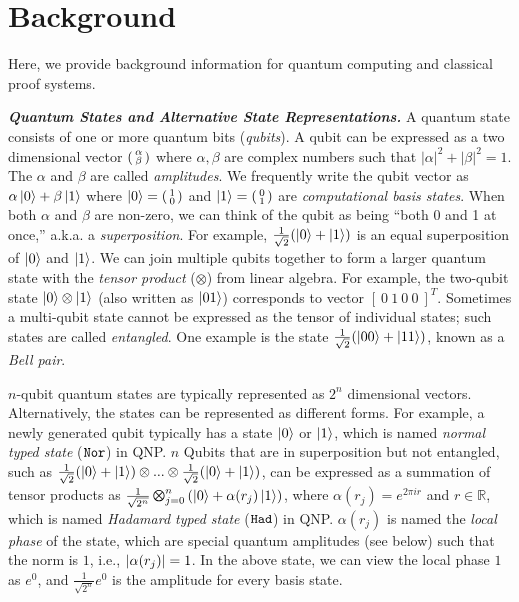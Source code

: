 \section{Background}
\label{sec:background}

Here, we provide background information for quantum computing and classical proof systems.

\noindent\textbf{\textit{Quantum States and Alternative State Representations.}} A quantum state consists of one or more quantum bits (\emph{qubits}). A qubit can be expressed as a two dimensional vector $\begin{psmallmatrix} \alpha \\ \beta \end{psmallmatrix}$ where $\alpha,\beta$ are complex numbers such that $|\alpha|^2 + |\beta|^2 = 1$.  The $\alpha$ and $\beta$ are called \emph{amplitudes}. 
%
We frequently write the qubit vector as $\alpha\left\vert{0}\right\rangle + \beta\left\vert{1}\right\rangle$ where $\left\vert{0}\right\rangle = \begin{psmallmatrix} 1 \\ 0 \end{psmallmatrix}$ and $\left\vert{1}\right\rangle = \begin{psmallmatrix} 0 \\ 1 \end{psmallmatrix}$ are \emph{computational basis states}. When both $\alpha$ and $\beta$ are non-zero, we can think of the qubit as being ``both 0 and 1 at once,'' a.k.a. a \emph{superposition}. For example, $\frac{1}{\sqrt{2}}(\left\vert{0}\right\rangle + \left\vert{1}\right\rangle)$ is an equal superposition of $\left\vert{0}\right\rangle$ and $\left\vert{1}\right\rangle$. 
We can join multiple qubits together to form a larger quantum state with the \emph{tensor product} ($\otimes$) from linear algebra. For example, the two-qubit state $\left\vert{0}\right\rangle \otimes \left\vert{1}\right\rangle$ (also written as $\left\vert{01}\right\rangle$) corresponds to vector $[~0~1~0~0~]^T$. 
Sometimes a multi-qubit state cannot be expressed as the tensor of individual states; such states are called \emph{entangled}. One example is the state $\frac{1}{\sqrt{2}}(\left\vert{00}\right\rangle + \left\vert{11}\right\rangle)$, known as a \emph{Bell pair}.

$n$-qubit quantum states are typically represented as $2^n$ dimensional vectors. Alternatively, the states can be represented as different forms. For example, a newly generated qubit typically has a state $\left\vert{0}\right\rangle$ or $\left\vert{1}\right\rangle$, which is named \textit{normal typed state} ($\texttt{Nor}$) in QNP. $n$ Qubits that are in superposition but not entangled, such as $\frac{1}{\sqrt{2}}(\left\vert{0}\right\rangle + \left\vert{1}\right\rangle)\otimes ... \otimes \frac{1}{\sqrt{2}}(\left\vert{0}\right\rangle + \left\vert{1}\right\rangle)$, can be expressed as a summation of tensor products as $\shad{2^n}{n}{\alpha(r_j)}$, where $\alpha(r_j)=e^{2\pi i r}$ and $r \in \mathbb{R}$, which is named \textit{Hadamard typed state} ($\texttt{Had}$) in QNP.
$\alpha(r_j)$ is named the \emph{local phase} of the state, which are special quantum amplitudes (see below) such that the norm is $1$, i.e., $|\alpha(r_j)|=1$. In the above state, we can view the local phase $1$ as $e^{0}$, and $\frac{1}{\sqrt{2^n}}e^{0}$ is the amplitude for every basis state.

